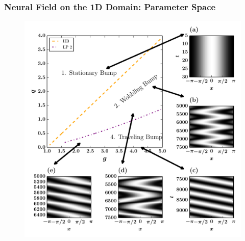 \documentclass{beamer}
\begin{document}
\begin{frame}
\frametitle{Neural Field on the 1D Domain: Parameter Space}
\begin{figure}
 \includegraphics[width=.6\textwidth]{oned_full_2par5.pdf}
\end{figure}
\end{frame}
% 
% 
\end{document}

